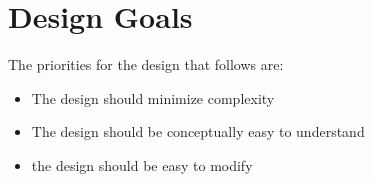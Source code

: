 \section{Design Goals}

The priorities for the design that follows are:
\begin{itemize}
    \item The design should minimize complexity
    \item The design should be conceptually easy to understand
    \item the design should be easy to modify
\end{itemize}
